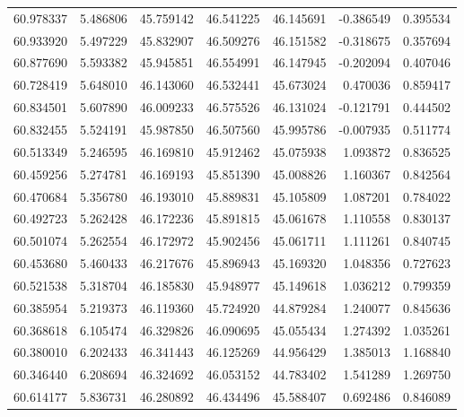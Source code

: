 \begin{tabular}{rrrrrrr}
 60.978337 &   5.486806 &         45.759142 &         46.541225 &         46.145691 & -0.386549 &  0.395534 \\
 60.933920 &   5.497229 &         45.832907 &         46.509276 &         46.151582 & -0.318675 &  0.357694 \\
 60.877690 &   5.593382 &         45.945851 &         46.554991 &         46.147945 & -0.202094 &  0.407046 \\
 60.728419 &   5.648010 &         46.143060 &         46.532441 &         45.673024 &  0.470036 &  0.859417 \\
 60.834501 &   5.607890 &         46.009233 &         46.575526 &         46.131024 & -0.121791 &  0.444502 \\
 60.832455 &   5.524191 &         45.987850 &         46.507560 &         45.995786 & -0.007935 &  0.511774 \\
 60.513349 &   5.246595 &         46.169810 &         45.912462 &         45.075938 &  1.093872 &  0.836525 \\
 60.459256 &   5.274781 &         46.169193 &         45.851390 &         45.008826 &  1.160367 &  0.842564 \\
 60.470684 &   5.356780 &         46.193010 &         45.889831 &         45.105809 &  1.087201 &  0.784022 \\
 60.492723 &   5.262428 &         46.172236 &         45.891815 &         45.061678 &  1.110558 &  0.830137 \\
 60.501074 &   5.262554 &         46.172972 &         45.902456 &         45.061711 &  1.111261 &  0.840745 \\
 60.453680 &   5.460433 &         46.217676 &         45.896943 &         45.169320 &  1.048356 &  0.727623 \\
 60.521538 &   5.318704 &         46.185830 &         45.948977 &         45.149618 &  1.036212 &  0.799359 \\
 60.385954 &   5.219373 &         46.119360 &         45.724920 &         44.879284 &  1.240077 &  0.845636 \\
 60.368618 &   6.105474 &         46.329826 &         46.090695 &         45.055434 &  1.274392 &  1.035261 \\
 60.380010 &   6.202433 &         46.341443 &         46.125269 &         44.956429 &  1.385013 &  1.168840 \\
 60.346440 &   6.208694 &         46.324692 &         46.053152 &         44.783402 &  1.541289 &  1.269750 \\
 60.614177 &   5.836731 &         46.280892 &         46.434496 &         45.588407 &  0.692486 &  0.846089 \\

\end{tabular}
